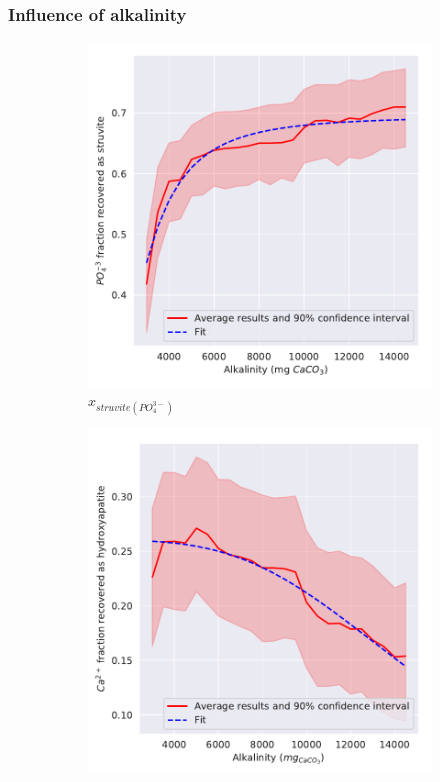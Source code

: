 \documentclass[10pt,a4paper]{article}
\begin{document}
\subsubsection{Influence of alkalinity}
\begin{figure}[H] 
	\centering
	\begin{subfigure}[t]{0.32\textheight}
		\includegraphics[width=\textwidth]{plotStrYield_Alk}
		\caption{$x_{struvite \left(PO_{4}^{3-}\right)}$}
		\label{fig:estimation_Alk_struviteYield}
	\end{subfigure}
	\begin{subfigure}[t]{0.32\textheight}
		\includegraphics[width=\textwidth]{x_plotHAPYield_Alk} 

\end{subfigure}
\end{figure}
\end{document}
